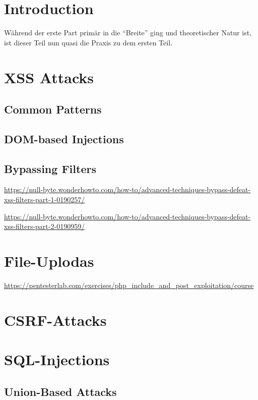 \chapter{Introduction}

Während der erste Part primär in die ``Breite'' ging und theoretischer Natur ist, ist dieser Teil nun quasi die Praxis zu dem ersten Teil.

\chapter{XSS Attacks}

\section{Common Patterns}

\section{DOM-based Injections}

\section{Bypassing Filters}

\url{https://null-byte.wonderhowto.com/how-to/advanced-techniques-bypass-defeat-xss-filters-part-1-0190257/}

\url{https://null-byte.wonderhowto.com/how-to/advanced-techniques-bypass-defeat-xss-filters-part-2-0190959/}

\chapter{File-Uplodas}

\url{https://pentesterlab.com/exercises/php_include_and_post_exploitation/course}

\chapter{CSRF-Attacks}

\chapter{SQL-Injections}

\section{Union-Based Attacks}

